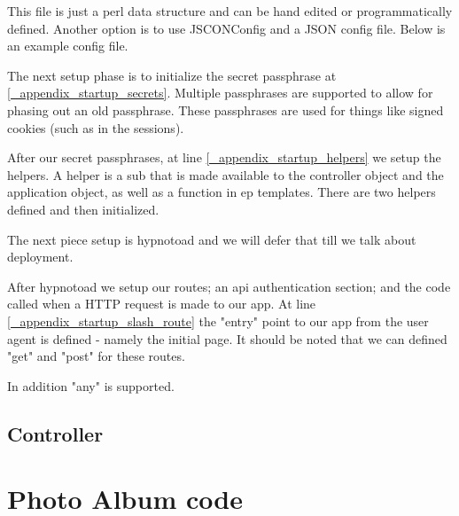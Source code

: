 \documentclass[16pt,pdftex]{book}
\begin{document}
This file is just a perl data structure and can be hand edited or
programmatically defined.  Another option is to use JSCONConfig and a JSON
config file.  Below is an example config file.



The next setup phase is to initialize the secret passphrase at
\ref{_appendix_startup_secrets}.  Multiple passphrases are supported to allow
for phasing out an old passphrase.  These passphrases are used for things like
signed cookies (such as in the sessions).

After our secret passphrases, at line \ref{_appendix_startup_helpers} we setup
the helpers.  A helper is a sub that is made available to the controller object
and the application object, as well as a function in ep templates.  There are
two helpers defined and then initialized.

The next piece setup is hypnotoad and we will defer that till we talk about deployment.

After hypnotoad we setup our routes; an api authentication section; and the
code called when a HTTP request is made to our app.  At line
\ref{_appendix_startup_slash_route} the "entry" point to our app from the user
agent is defined - namely the initial page.  It should be noted that we can
defined "get" and "post" for these routes.  

In addition "any" is supported.

\subsection{Controller}

\appendix
\section{Photo Album code}

% 








\end{document}
